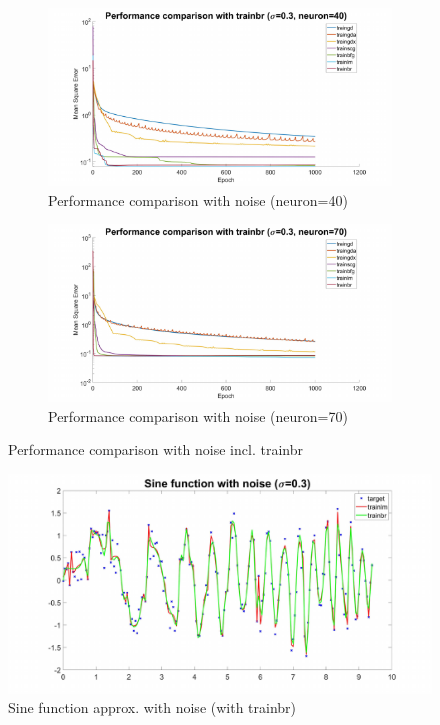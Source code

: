 \documentclass{article}
\begin{document}
\begin{figure}[h!]
\begin{subfigure}[b]{.49\textwidth}
  \centering
  \includegraphics[width=\linewidth]{lab1/trainbr40noise.pdf}
  \caption{Performance comparison with noise (neuron=40)}
  \label{fig:noisebr40}
\end{subfigure}
\hfill
\begin{subfigure}[b]{.49\textwidth}
  \centering
  \includegraphics[width=\linewidth]{lab1/trainbr70noise.pdf}
  \caption{Performance comparison with noise (neuron=70)}
  \label{fig:noisebr70}
\end{subfigure}
\caption{Performance comparison with noise incl. trainbr}
\label{fig:fig}
\end{figure}

\begin{figure}[h!]
  \centering
  \includegraphics[width=\textwidth]{lab1/noisetrainbr.pdf}
  \caption{Sine function approx. with noise (with trainbr)}
  \label{fig:trainbrsinenoisecurve}
\end{figure}
\end{document}
